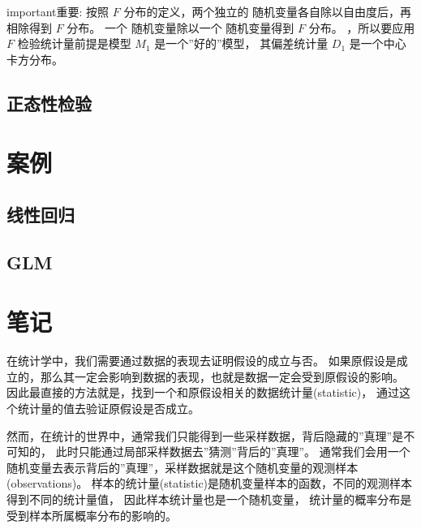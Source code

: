 \documentclass[letterpaper,10pt,english]{sphinxmanual}
\begin{document}
\begin{sphinxadmonition}{important}{重要:}
按照 \(F\) 分布的定义，两个独立的  随机变量各自除以自由度后，再相除得到  \(F\) 分布。
一个  随机变量除以一个  随机变量得到  \(F\) 分布。
，所以要应用 \(F\) 检验统计量前提是模型 \(M_1\) 是一个”好的”模型，
其偏差统计量 \(D_1\) 是一个中心卡方分布。
\end{sphinxadmonition}


\subsection{正态性检验}
\label{\detokenize{_u6a21_u578b_u8bc4_u4f30/influence:id12}}

\section{案例}
\label{\detokenize{_u6a21_u578b_u8bc4_u4f30/influence:id13}}

\subsection{线性回归}
\label{\detokenize{_u6a21_u578b_u8bc4_u4f30/influence:id14}}

\subsection{GLM}
\label{\detokenize{_u6a21_u578b_u8bc4_u4f30/influence:id15}}

\section{笔记}
\label{\detokenize{_u6a21_u578b_u8bc4_u4f30/influence:id16}}
在统计学中，我们需要通过数据的表现去证明假设的成立与否。
如果原假设是成立的，那么其一定会影响到数据的表现，也就是数据一定会受到原假设的影响。
因此最直接的方法就是，找到一个和原假设相关的数据统计量(statistic)，
通过这个统计量的值去验证原假设是否成立。

然而，在统计的世界中，通常我们只能得到一些采样数据，背后隐藏的”真理”是不可知的，
此时只能通过局部采样数据去”猜测”背后的”真理”。
通常我们会用一个随机变量去表示背后的”真理”，采样数据就是这个随机变量的观测样本(observations)。
样本的统计量(statistic)是随机变量样本的函数，不同的观测样本得到不同的统计量值，
因此样本统计量也是一个随机变量，
统计量的概率分布是受到样本所属概率分布的影响的。
\end{document}
